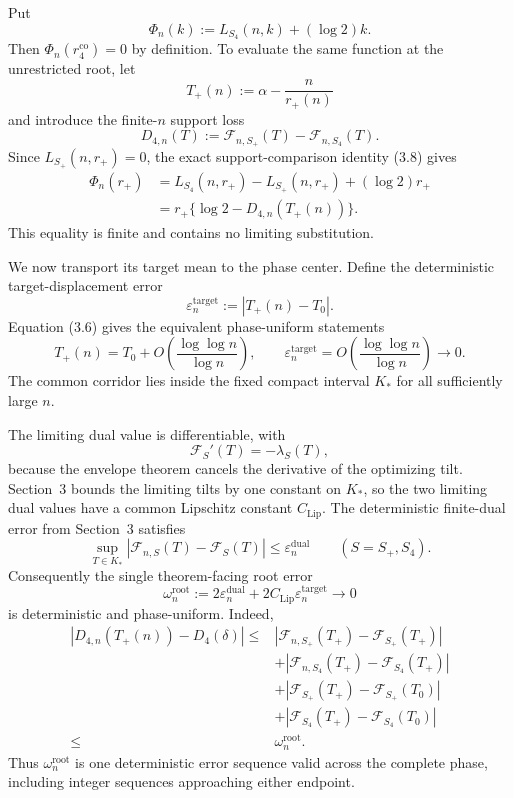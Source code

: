 
Put
\[
  \Phi_n(k):=L_{S_4}(n,k)+(\log 2)k.
\]
Then $\Phi_n(r_4^{\mathrm{co}})=0$ by definition. To evaluate the same
function at the unrestricted root, let
\[
  T_+(n):=\alpha-\frac{n}{r_+(n)}
\]
and introduce the finite-$n$ support loss
\[
  D_{4,n}(T):=
  \mathcal F_{n,S_+}(T)-\mathcal F_{n,S_4}(T).
\]
Since $L_{S_+}(n,r_+)=0$, the exact support-comparison identity (3.8) gives
\begin{equation*}
\begin{aligned}
  \Phi_n(r_+)
  &=L_{S_4}(n,r_+)-L_{S_+}(n,r_+)+(\log 2)r_+\\
  &=r_+\{\log 2-D_{4,n}(T_+(n))\}.
\end{aligned}
\tag{5.9a}
\end{equation*}
This equality is finite and contains no limiting substitution.

We now transport its target mean to the phase center. Define the deterministic
target-displacement error
\[
  \varepsilon_n^{\mathrm{target}}
  :=|T_+(n)-T_0|.
\]
Equation (3.6) gives the equivalent phase-uniform statements
\begin{equation*}
  T_+(n)=T_0+O\!\left(\frac{\log\log n}{\log n}\right),
  \qquad
  \varepsilon_n^{\mathrm{target}}
  =O\!\left(\frac{\log\log n}{\log n}\right)
  \longrightarrow0.
  \tag{5.9b}
\end{equation*}
The common corridor lies inside the fixed compact interval $K_*$ for all
sufficiently large $n$.

The limiting dual value is differentiable, with
\[
  \mathcal F_S'(T)=-\lambda_S(T),
\]
because the envelope theorem cancels the derivative of the optimizing tilt.
Section~3 bounds the limiting tilts by one constant on $K_*$, so the two
limiting dual values have a common Lipschitz constant $C_{\mathrm{Lip}}$.
The deterministic finite-dual error from Section~3 satisfies
\[
  \sup_{T\in K_*}
  |\mathcal F_{n,S}(T)-\mathcal F_S(T)|
  \le\varepsilon_n^{\mathrm{dual}}
  \qquad(S=S_+,S_4).
\]
Consequently the single theorem-facing root error
\begin{equation*}
  \omega_n^{\mathrm{root}}
  :=2\varepsilon_n^{\mathrm{dual}}
    +2C_{\mathrm{Lip}}\varepsilon_n^{\mathrm{target}}
  \longrightarrow0
  \tag{5.9c}
\end{equation*}
is deterministic and phase-uniform. Indeed,
\[
\begin{aligned}
  |D_{4,n}(T_+(n))-D_4(\delta)|
  \le{}&
  |\mathcal F_{n,S_+}(T_+)-\mathcal F_{S_+}(T_+)|\\
  &+|\mathcal F_{n,S_4}(T_+)-\mathcal F_{S_4}(T_+)|\\
  &+|\mathcal F_{S_+}(T_+)-\mathcal F_{S_+}(T_0)|\\
  &+|\mathcal F_{S_4}(T_+)-\mathcal F_{S_4}(T_0)|\\
  \le{}&\omega_n^{\mathrm{root}}.
\end{aligned}
\]
Thus $\omega_n^{\mathrm{root}}$ is one deterministic error sequence valid
across the complete phase, including integer sequences approaching either
endpoint.

